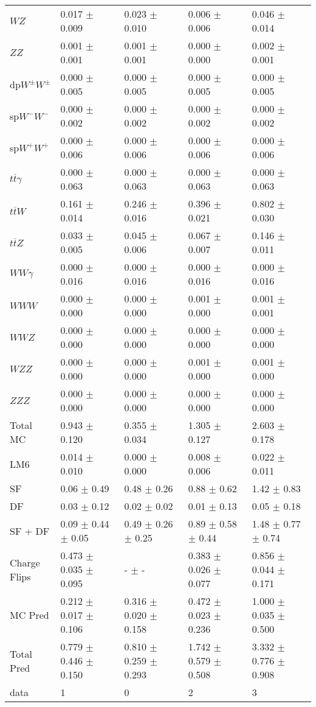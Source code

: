 \begin{tabular}{l | l l l l}
$WZ$ &  0.017 $\pm$  0.009 &  0.023 $\pm$  0.010 &  0.006 $\pm$  0.006 &  0.046 $\pm$  0.014\\
$ZZ$ &  0.001 $\pm$  0.001 &  0.001 $\pm$  0.001 &   0.000 $\pm$   0.000 &  0.002 $\pm$  0.001\\
\hline
dp$W^{\pm}W^{\pm}$ &  0.000 $\pm$  0.005 &  0.000 $\pm$  0.005 &  0.000 $\pm$  0.005 &  0.000 $\pm$  0.005\\
sp$W^{-}W^{-}$ &  0.000 $\pm$  0.002 &  0.000 $\pm$  0.002 &  0.000 $\pm$  0.002 &  0.000 $\pm$  0.002\\
sp$W^{+}W^{+}$ &  0.000 $\pm$  0.006 &  0.000 $\pm$  0.006 &  0.000 $\pm$  0.006 &  0.000 $\pm$  0.006\\
$t\overline{t}\gamma$ &  0.000 $\pm$  0.063 &  0.000 $\pm$  0.063 &  0.000 $\pm$  0.063 &  0.000 $\pm$  0.063\\
$t\overline{t}W$ &  0.161 $\pm$  0.014 &  0.246 $\pm$  0.016 &  0.396 $\pm$  0.021 &  0.802 $\pm$  0.030\\
$t\overline{t}Z$ &  0.033 $\pm$  0.005 &  0.045 $\pm$  0.006 &  0.067 $\pm$  0.007 &  0.146 $\pm$  0.011\\
$WW\gamma$ &  0.000 $\pm$  0.016 &  0.000 $\pm$  0.016 &  0.000 $\pm$  0.016 &  0.000 $\pm$  0.016\\
$WWW$ &   0.000 $\pm$   0.000 &   0.000 $\pm$   0.000 &  0.001 $\pm$   0.000 &  0.001 $\pm$  0.001\\
$WWZ$ &   0.000 $\pm$   0.000 &   0.000 $\pm$   0.000 &  0.000 $\pm$   0.000 &   0.000 $\pm$   0.000\\
$WZZ$ &  0.000 $\pm$   0.000 &   0.000 $\pm$   0.000 &  0.001 $\pm$   0.000 &  0.001 $\pm$   0.000\\
$ZZZ$ &   0.000 $\pm$   0.000 &   0.000 $\pm$   0.000 &   0.000 $\pm$   0.000 &   0.000 $\pm$   0.000\\
\hline
Total MC &  0.943 $\pm$  0.120 &  0.355 $\pm$  0.034 &  1.305 $\pm$  0.127 &  2.603 $\pm$  0.178\\
\hline\hline
\hline
LM6 &  0.014 $\pm$  0.010 &  0.000 $\pm$  0.000 &  0.008 $\pm$  0.006 &  0.022 $\pm$  0.011\\
\hline\hline
\hline\hline
 SF  & 0.06 $\pm$ 0.49 & 0.48 $\pm$ 0.26 & 0.88 $\pm$ 0.62 & 1.42 $\pm$ 0.83\\
 DF  & 0.03 $\pm$ 0.12 & 0.02 $\pm$ 0.02 & 0.01 $\pm$ 0.13 & 0.05 $\pm$ 0.18\\
\hline
 SF + DF  & 0.09 $\pm$ 0.44 $\pm$ 0.05 & 0.49 $\pm$ 0.26 $\pm$ 0.25 & 0.89 $\pm$ 0.58 $\pm$ 0.44 & 1.48 $\pm$ 0.77 $\pm$ 0.74\\
\hline\hline
Charge Flips & 0.473 $\pm$ 0.035 $\pm$ 0.095 & - $\pm$ - & 0.383 $\pm$ 0.026 $\pm$ 0.077 & 0.856 $\pm$ 0.044 $\pm$ 0.171\\
\hline\hline
\hline
MC Pred &  0.212 $\pm$  0.017 $\pm$  0.106 &  0.316 $\pm$  0.020 $\pm$  0.158 &  0.472 $\pm$  0.023 $\pm$  0.236 &  1.000 $\pm$  0.035 $\pm$  0.500\\
\hline\hline
Total Pred &  0.779 $\pm$  0.446 $\pm$  0.150 &  0.810 $\pm$  0.259 $\pm$  0.293 &  1.742 $\pm$  0.579 $\pm$  0.508 &  3.332 $\pm$  0.776 $\pm$  0.908\\
\hline\hline
data & 1 & 0 & 2 & 3\\
\hline\hline
\end{tabular}
